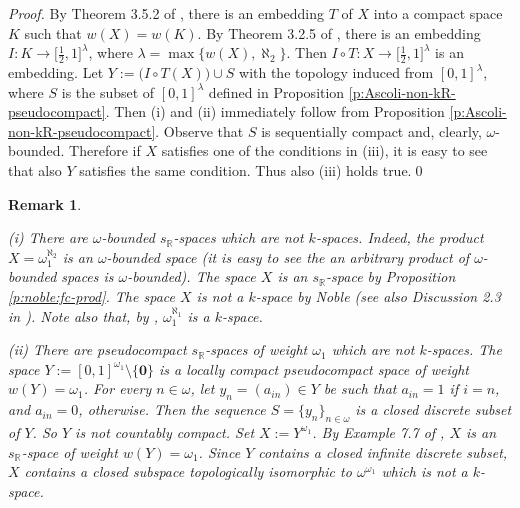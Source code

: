\documentclass[preprint,11pt]{elsarticle}
\newtheorem{remark}[theorem]{Remark}
\numberwithin{equation}{section}
\numberwithin{theorem}{section}
\newcommand{\w}{\omega}
\newcommand{\ZZ}{\mathbb{Z}}
\newcommand{\IR}{\mathbb{R}}
\newcommand{\SM}{{\setminus}}
\begin{document}
\begin{proof}
By Theorem 3.5.2 of \cite{Eng}, there is an embedding $T$ of $X$ into a compact space $K$ such that $w(X)=w(K)$. By Theorem 3.2.5 of \cite{Eng}, there is an embedding $I:K\to \big[\tfrac{1}{2},1\big]^{\lambda}$, where $\lambda=\max\{w(X), \aleph_2\}$. Then $I\circ T:X\to  \big[\tfrac{1}{2},1\big]^\lambda$ is an embedding. Let $Y:=\big(I\circ T(X)\big)\cup  S$ with the topology induced from $[0,1]^\lambda$, where  $S$ is the subset of $[0,1]^\lambda$ defined in Proposition \ref{p:Ascoli-non-kR-pseudocompact}. Then (i) and (ii) immediately follow from Proposition \ref{p:Ascoli-non-kR-pseudocompact}. Observe that  $S$ is  sequentially compact and, clearly, $\w$-bounded. Therefore if $X$ satisfies one of the conditions in (iii), it is easy to see that also $Y$ satisfies the same condition. Thus also (iii) holds true.\qed
\end{proof}

\begin{remark} \label{rem:kR-1} {\em
(i) There are $\w$-bounded $s_\IR$-spaces which are not $k$-spaces. Indeed, the product $X=\w_1^{\aleph_2}$ is an $\w$-bounded space (it is easy to see the an arbitrary product of $\w$-bounded spaces is $\w$-bounded). %
The space $X$ is an $s_\IR$-space by Proposition \ref{p:noble:fc-prod}.  The space $X$ is not a $k$-space by Noble \cite{Noble-72} (see also Discussion 2.3 in \cite{Comfort-99}). Note also that, by \cite{Noble-72}, $\w_1^{\aleph_1}$ is a $k$-space.

(ii) There are pseudocompact $s_\IR$-spaces of weight $\w_1$ which are not $k$-spaces. The space $Y:=[0,1]^{\omega_1}\SM \{\mathbf{0}\}$ is a locally compact pseudocompact space of weight $w(Y)=\w_1$. For every $n\in\w$, let $y_n=(a_{in})\in Y$ be such that $a_{in}=1$ if $i=n$, and $a_{in}=0$, otherwise. Then the sequence $S=\{y_n\}_{n\in\w}$ is a closed discrete subset of $Y$. So $Y$ is not countably compact. Set $X:=Y^{\omega_1}$. By Example 7.7 of \cite{GR-kR-sR}, $X$ is an $s_\IR$-space of weight $w(Y)=\w_1$. Since $Y$ contains a closed infinite discrete subset,  $X$ contains a closed subspace topologically isomorphic to  $\w^{\w_1}$ which is not a $k$-space.
%
}
\end{remark}
\end{document}
